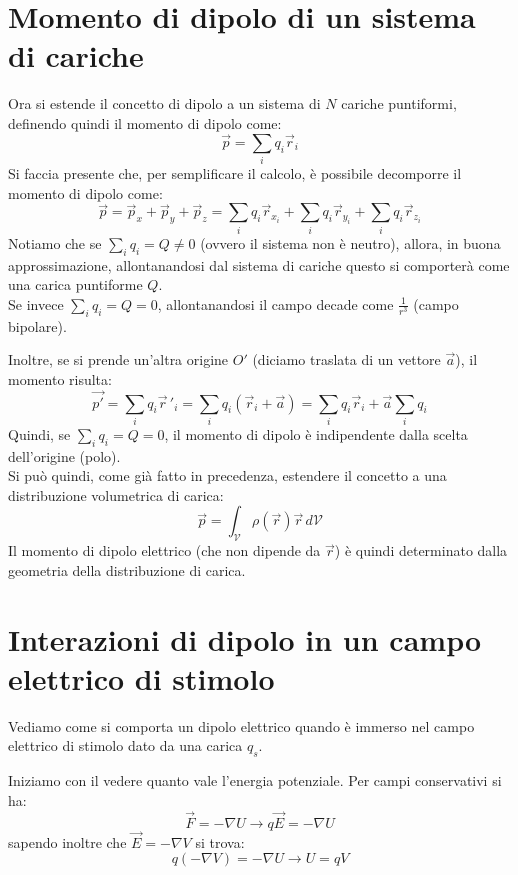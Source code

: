 \documentclass{book}
\begin{document}
\section{Momento di dipolo di un sistema di cariche}
Ora si estende il concetto di dipolo a un sistema di $N$ cariche puntiformi, definendo quindi il momento di dipolo come:
\begin{equation*}
\vec{p}=\sum_i q_i\vec{r}_i
\end{equation*}
Si faccia presente che, per semplificare il calcolo, \`e possibile decomporre il momento di dipolo come:
\begin{equation*}
\vec{p} = \vec{p}_x+\vec{p}_y+\vec{p}_z= \sum_i q_i\vec{r}_{x_i} + \sum_i q_i\vec{r}_{y_i} + \sum_i q_i\vec{r}_{z_i}  
\end{equation*}
Notiamo che se $\sum_i q_i = Q \neq 0$ (ovvero il sistema non \`e neutro), allora, in buona approssimazione, allontanandosi dal sistema di cariche questo si comporter\`a come una carica puntiforme $Q$.\\
Se invece $\sum_i q_i = Q = 0$, allontanandosi il campo decade come $\frac{1}{r^3}$ (campo bipolare).

Inoltre, se si prende un'altra origine $O'$ (diciamo traslata di un vettore $\vec{a}$), il momento risulta:
\begin{equation*}
\vec{p'}=\sum_i q_i\vec{r}\,'_i =  \sum_i q_i(\vec{r}_i+\vec{a})= \sum_i q_i\vec{r}_i + \vec{a}\sum_i q_i
\end{equation*}
Quindi, se $\sum_i q_i = Q = 0$, il momento di dipolo \`e indipendente dalla scelta dell'origine (polo).\\
Si pu\`o quindi, come gi\`a fatto in precedenza, estendere il concetto a una distribuzione volumetrica di carica:
\begin{equation*}
\vec{p}= \int_{\mathcal{V}}\rho(\vec{r})\vec{r}\,d\mathcal{V}
\end{equation*}
Il momento di dipolo elettrico (che non dipende da $\vec{r}$) \`e quindi determinato dalla geometria della distribuzione di carica.

\section{Interazioni di dipolo in un campo elettrico di stimolo}
Vediamo come si comporta un dipolo elettrico quando è immerso nel campo elettrico di stimolo dato da una carica $q_s$.

Iniziamo con il vedere quanto vale l'energia potenziale.
Per campi conservativi si ha:
$$
\vec{F}=-\nabla U \to q\vec{E} = - \nabla U
$$
sapendo inoltre che $\vec{E}=-\nabla V$ si trova:
$$q(-\nabla V) = -\nabla U \to U = qV $$
\end{document}
